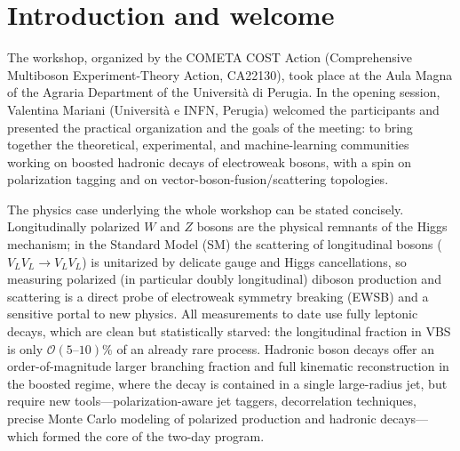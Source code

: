 \section{Introduction and welcome}

The workshop, organized by the COMETA COST Action (Comprehensive Multiboson
Experiment-Theory Action, CA22130), took place at the Aula Magna of the Agraria
Department of the Universit\`a di Perugia. In the opening session, Valentina
Mariani (Universit\`a e INFN, Perugia) welcomed the participants and presented
the practical organization and the goals of the meeting: to bring together the
theoretical, experimental, and machine-learning communities working on boosted
hadronic decays of electroweak bosons, with a spin on polarization tagging and
on vector-boson-fusion/scattering topologies.

The physics case underlying the whole workshop can be stated concisely.
Longitudinally polarized $W$ and $Z$ bosons are the physical remnants of the
Higgs mechanism; in the Standard Model (SM) the scattering of longitudinal
bosons ($V_L V_L \to V_L V_L$) is unitarized by delicate gauge and Higgs
cancellations, so measuring polarized (in particular doubly longitudinal)
diboson production and scattering is a direct probe of electroweak symmetry
breaking (EWSB) and a sensitive portal to new physics. All measurements to date
use fully leptonic decays, which are clean but statistically starved: the
longitudinal fraction in VBS is only $\mathcal{O}(5\text{--}10)\%$ of an already
rare process. Hadronic boson decays offer an order-of-magnitude larger
branching fraction and full kinematic reconstruction in the boosted regime,
where the decay is contained in a single large-radius jet, but require new
tools---polarization-aware jet taggers, decorrelation techniques, precise Monte
Carlo modeling of polarized production and hadronic decays---which formed the
core of the two-day program.
